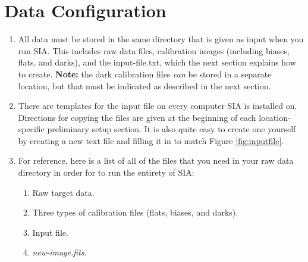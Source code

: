 \documentclass[11pt]{report}
\begin{document}
\section{Data Configuration}
\label{sect:dataconfig}
\begin{enumerate}
\item All data must be stored in the same directory that is given as input when you run SIA. This includes raw data files, calibration images (including biases, flats, and darks), and the input-file.txt, which the next section explains how to create. {\bf Note:} the dark calibration files \emph{can} be stored in a separate location, but that must be indicated as described in the next section.
\item There are templates for the input file on every computer SIA is installed on. Directions for copying the files are given at the beginning of each location-specific preliminary setup section. It is also quite easy to create one yourself by creating a new text file and filling it in to match Figure \ref{fig:inputfile}.
\item For reference, here is a list of all of the files that you need in your raw data directory in order for to run the entirety of SIA:  \label{itm:filelist}
	\begin{enumerate}
		\item Raw target data.
		\item Three types of calibration files (flats, biases, and darks).
		\item Input file.
		\item \emph{new-image.fits}.
	\end{enumerate}
\end{enumerate}
\end{document}
